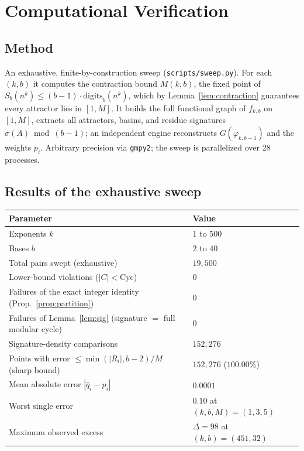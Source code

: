 \documentclass[11pt]{article}
\theoremstyle{definition}
\theoremstyle{remark}
\newcommand{\Cyc}{\mathrm{Cyc}}
\begin{document}
\section{Computational Verification}\label{sec:verification}

\subsection{Method}

An exhaustive, finite-by-construction sweep (\texttt{scripts/sweep.py}). For each $(k,b)$ it computes the contraction bound $M(k,b)$, the fixed point of $S_b(n^k) \le (b-1)\cdot\mathrm{digits}_b(n^k)$, which by Lemma~\ref{lem:contraction} guarantees every attractor lies in $[1,M]$. It builds the full functional graph of $f_{k,b}$ on $[1,M]$, extracts all attractors, basins, and residue signatures $\sigma(A) \bmod (b-1)$; an independent engine reconstructs $G(\varphi_{k,b-1})$ and the weights $p_i$. Arbitrary precision via \texttt{gmpy2}; the sweep is parallelized over 28 processes.

\subsection{Results of the exhaustive sweep}

\begin{center}
\begin{tabular}{@{}ll@{}}
\toprule
\textbf{Parameter} & \textbf{Value} \\
\midrule
Exponents $k$ & $1$ to $500$ \\
Bases $b$ & $2$ to $40$ \\
Total pairs swept (exhaustive) & $19{,}500$ \\
Lower-bound violations ($|C| < \Cyc$) & $0$ \\
Failures of the exact integer identity (Prop.~\ref{prop:partition}) & $0$ \\
Failures of Lemma~\ref{lem:sig} (signature $=$ full modular cycle) & $0$ \\
Signature-density comparisons & $152{,}276$ \\
Points with error $\le \min(|R_i|,b-2)/M$ (sharp bound) & $152{,}276$ ($100.00\%$) \\
Mean absolute error $|\hat q_i - p_i|$ & $0.0001$ \\
Worst single error & $0.10$ at $(k,b,M) = (1,3,5)$ \\
Maximum observed excess & $\Delta = 98$ at $(k,b) = (451,32)$ \\
\bottomrule
\end{tabular}
\end{center}
\end{document}
